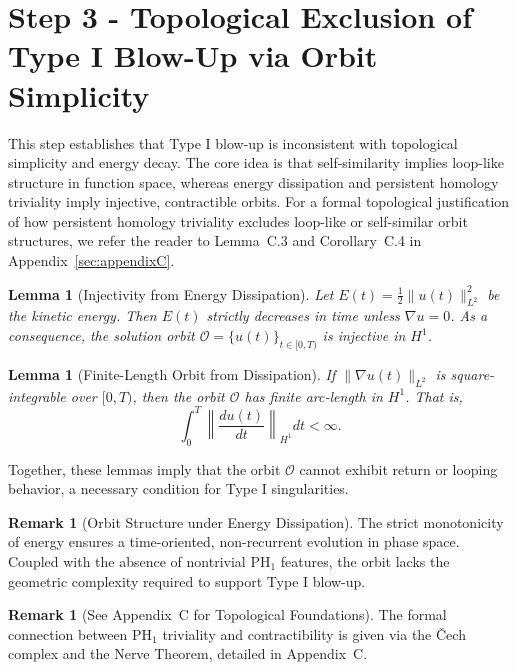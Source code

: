 \documentclass[11pt]{article}
\newtheorem{lemma}[theorem]{Lemma}
\theoremstyle{definition}
\newtheorem{remark}[theorem]{Remark}
\begin{document}
\section{Step 3 - Topological Exclusion of Type I Blow-Up via Orbit Simplicity}

This step establishes that Type I blow-up is inconsistent with topological simplicity and energy decay. The core idea is that self-similarity implies loop-like structure in function space, whereas energy dissipation and persistent homology triviality imply injective, contractible orbits.
For a formal topological justification of how persistent homology triviality excludes loop-like or self-similar orbit structures, we refer the reader to Lemma~C.3 and Corollary~C.4 in Appendix~\ref{sec:appendixC}.

\begin{lemma}[Injectivity from Energy Dissipation]
Let $E(t) = \frac{1}{2} \|u(t)\|_{L^2}^2$ be the kinetic energy. Then $E(t)$ strictly decreases in time unless $\nabla u = 0$. As a consequence, the solution orbit $\mathcal{O} = \{ u(t) \}_{t \in [0,T)}$ is injective in $H^1$.
\end{lemma}

\begin{lemma}[Finite-Length Orbit from Dissipation]
If $\| \nabla u(t) \|_{L^2}$ is square-integrable over $[0,T)$, then the orbit $\mathcal{O}$ has finite arc-length in $H^1$. That is,
\[
\int_0^T \left\| \frac{d u(t)}{dt} \right\|_{H^1} dt < \infty.
\]
\end{lemma}

Together, these lemmas imply that the orbit $\mathcal{O}$ cannot exhibit return or looping behavior, a necessary condition for Type I singularities.

\begin{remark}[Orbit Structure under Energy Dissipation]
The strict monotonicity of energy ensures a time-oriented, non-recurrent evolution in phase space. Coupled with the absence of nontrivial PH$_1$ features, the orbit lacks the geometric complexity required to support Type I blow-up.
\end{remark}

\begin{remark}[See Appendix~C for Topological Foundations]
The formal connection between PH$_1$ triviality and contractibility is given via the Čech complex and the Nerve Theorem, detailed in Appendix~C.
\end{remark}
\end{document}
